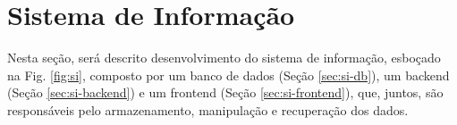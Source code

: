 \chapter{Sistema de Informação}
\label{sec:si}


\begin{overview}
  \lipsum[1]
\end{overview}


Nesta seção, será descrito desenvolvimento do sistema de informação, esboçado na Fig. \ref{fig:si}, composto por um banco de dados (Seção \ref{sec:si-db}), um backend (Seção \ref{sec:si-backend}) e um frontend (Seção \ref{sec:si-frontend}), que, juntos, são responsáveis pelo armazenamento, manipulação e recuperação dos dados.

